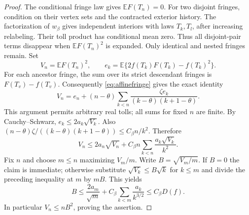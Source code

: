 \documentclass[runningheads,envcountsame,orivec]{llncs}
\newcommand{\E}{\mathbb E}
\begin{document}
\begin{proof}
The conditional fringe law gives $\E F(T_n)=0$.
For two disjoint fringes, condition on their vertex sets and the
contracted exterior history. The factorization of $w_\beta$ gives
independent interiors with laws $T_k,T_l$, after increasing
relabeling. Their toll product has conditional mean zero. Thus all
disjoint-pair terms disappear when $\E F(T_n)^2$ is expanded.
Only identical and nested fringes remain. Set
\[
 V_n=\E F(T_n)^2,\qquad
 e_k=\E\{2f(T_k)F(T_k)-f(T_k)^2\}.
\]
For each ancestor fringe, the sum over its strict descendant fringes
is $F(T_v)-f(T_v)$. Consequently \eqref{eq:affinefringe} gives the
exact identity
\begin{equation}\label{eq:centeredvarianceidentity}
 V_n=e_n+(n-\theta)\sum_{k<n}
       \frac{\zeta e_k}{(k-\theta)(k+1-\theta)}.
\end{equation}
This argument permits arbitrary real tolls; all sums for fixed $n$
are finite. By Cauchy--Schwarz, $e_k\le2a_k\sqrt{V_k}$.
Also $(n-\theta)\zeta/((k-\theta)(k+1-\theta))
\le C_\beta n/k^2$. Therefore
\[
 V_n\le2a_n\sqrt{V_n}
       +C_\beta n\sum_{k<n}\frac{a_k\sqrt{V_k}}{k^2}.
\]
Fix $n$ and choose $m\le n$ maximizing $V_m/m$.
Write $B=\sqrt{V_m/m}$. If $B=0$ the claim is immediate;
otherwise substitute $\sqrt{V_k}\le B\sqrt k$ for $k\le m$
and divide the preceding inequality at $m$ by $mB$. This yields
\[
 B\le\frac{2a_m}{\sqrt m}
       +C_\beta\sum_{k<m}\frac{a_k}{k^{3/2}}
 \le C_\beta D(f).
\]
In particular $V_n\le n B^2$, proving the assertion.
\end{proof}
\end{document}
